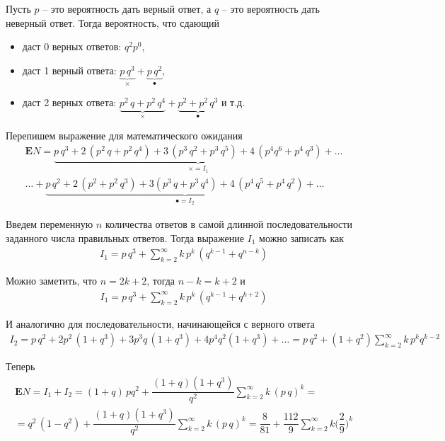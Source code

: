 \documentclass[%
	11pt,
	a4paper,
	utf8,
		]{article}
\begin{document}
Пусть $ p $ -- это вероятность дать верный ответ, а $ q $ -- это вероятность дать неверный ответ. Тогда вероятность, что сдающий
\begin{itemize}
	\item даст 0 верных ответов: $ q^2 p^0 $,
	
	\item даст 1 верный ответа: $ \underbrace{p \, q^3}\limits_{\times} + \underbrace{p \, q^2}\limits_{\bullet} $,
	
	\item даст 2 верных ответа: $ \underbrace{p^2 \, q + p^2 \, q^4}\limits_{\times} + \underbrace{p^2 + p^2 \, q^3}\limits_{\bullet} $ и т.д.
\end{itemize}

Перепишем выражение для математического ожидания
\begin{multline*}
	\mathbf{E}N = \underbrace{p \, q^3 + 2 \, (p^2 \, q + p^2 \, q^4) + 3 \, (p^3 \, q^2 + p^3 \, q^5) + 4 \, (p^4 q^6 + p^4 \, q^3) + \ldots}\limits_{\times=I_1} \\
	\ldots + \underbrace{p \, q^2 + 2 \, (p^2 + p^2 \, q^3) + 3 (p^3 \, q + p^3 \, q^4) + 4 \, (p^4 \, q^5 + p^4 \, q^2) + \ldots}\limits_{\bullet=I_2}
\end{multline*}

Введем переменную $ n $ количества ответов в самой длинной последовательности заданного числа правильных ответов. Тогда выражение $ I_1 $ можно записать как
\begin{align*}
	I_1 = p\, q^3 + \sum_{k=2}^{\infty} k \, p^k \, (q^{k-1} + q^{n-k})
\end{align*}

Можно заметить, что $ n = 2 k + 2 $, тогда $ n - k = k + 2 $ и
\begin{align*}
	I_1 = p\, q^3 + \sum_{k=2}^{\infty} k \, p^k \, (q^{k-1} + q^{k + 2})
\end{align*}

И аналогично для последовательности, начинающейся с верного ответа
\begin{align*}
	I_2 = p \, q^2 + 2p^2 \, (1 + q^3) + 3 p^3 q \, (1 + q^3) + 4 p^4q^2 (1 + q^3) + \ldots = p\,q^2 + (1 + q^2)\sum_{k=2}^{\infty} k \, p^k q^{k-2}
\end{align*}

Теперь
\begin{multline*}
	\mathbf{E}N = I_1 + I_2 = (1 + q) \, p q^2 + \dfrac{(1 + q)(1 + q^3)}{q^2} \sum_{k=2}^{\infty} k \, (p \, q)^k = \\
	 = q^2 \, (1 - q^2) + \dfrac{(1 + q)(1 + q^3)}{q^2} \sum_{k=2}^{\infty} k \, (p \, q)^k = \dfrac{8}{81} + \dfrac{112}{9} \sum_{k=2}^{\infty} k \bigg( \dfrac{2}{9} \bigg)^k
\end{multline*}
\end{document}
